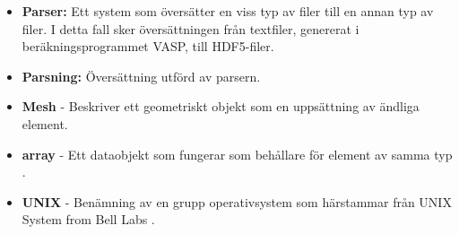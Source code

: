 \begin{itemize}
\item \textbf{Parser:} Ett system som översätter en viss typ av filer till en annan typ av filer. I detta fall sker översättningen från textfiler, genererat i beräkningsprogrammet VASP, till HDF5-filer.

\item \textbf{Parsning:} Översättning utförd av parsern.

\item \textbf{Mesh} - Beskriver ett geometriskt objekt som en uppsättning av ändliga element. 

\item \textbf{array} - Ett dataobjekt som fungerar som behållare för element av samma typ \cite{what is array}.  

\item \textbf{UNIX} - Benämning av en grupp operativsystem som härstammar från UNIX System from Bell Labs \cite{what is UNIX}.   
\end{itemize}

